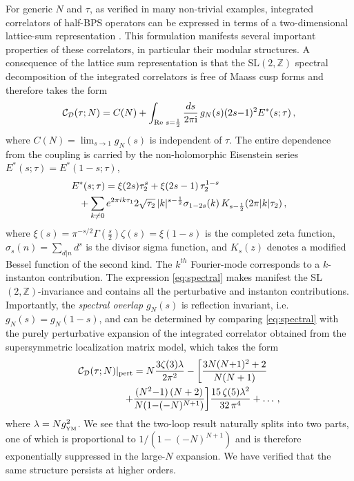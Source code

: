 \documentclass[aps,prl,twocolumn, longbibliography,footinbib,superscriptaddress, preprintnumbers]{revtex4-1}
\newcommand{\<}{\langle}
\renewcommand{\>}{\rangle}
\def\half{{\scriptstyle \frac 12}}
\def\Re{{\rm Re \,}}
\begin{document}
For generic $N$ and $\tau$, as verified in many non-trivial examples, integrated correlators of half-BPS operators can be expressed in terms of a two-dimensional lattice-sum representation \cite{Dorigoni:2021guq, Dorigoni:2021bvj}. This formulation manifests several important properties of these correlators, in particular their modular structures. A consequence of the lattice sum representation is that the SL$(2,\mathbb{Z})$ spectral decomposition of the integrated correlators is free of Maass cusp forms and therefore takes the form \cite{Collier:2022emf,Paul:2022piq}
\begin{align} \label{eq:spectral}
 \mathcal{C}_{\mathcal{D}}(\tau; N)
 = C(N)
 + \int_{\Re\, s=\frac{1}{2}} \frac{ds}{2\pi {\rm i} } \, g_N(s) (2s{-}1)^2  E^*(s;\tau)\, ,
\end{align}
 where ${C}(N) =\lim_{s \to 1} g_N(s)$ is independent of $\tau$. The entire dependence from the coupling is carried by the non-holomorphic Eisenstein series $E^*(s; \tau)=E^*(1{-}s; \tau)$,
 \begin{align}
 &  E^*(s;\tau)
\label{Eisen_series_definitions} =\xi(2s)\tau_2^s  +  \xi(2s-1)\, \tau_2^{1-s}\\
&\notag \phantom{=}+ \sum_{   k\neq0}e^{2\pi i k\tau_1}    2\sqrt{\tau_2}\,  |k|^{s-\half}\sigma_{1-2s} (k)     \, K_{s-\half}(2\pi |k| \tau_2) \,,
\end{align}
where $\xi(s) = \pi^{-s/2}\Gamma(\frac{s}{2})\zeta(s)=\xi(1{-}s)$ is the completed zeta function, $\sigma_s(n) = \sum_{d\vert n }d^s$ is the divisor sigma function, and $K_s(z)$ denotes a modified Bessel function of the second kind.
The $k^{th}$ Fourier-mode corresponds to a $k$-instanton contribution. The expression \eqref{eq:spectral} makes manifest the SL$(2, \mathbb{Z})$-invariance and contains all the perturbative and instanton contributions. Importantly, the \textit{spectral overlap} $g_N(s)$ is reflection invariant, i.e. $g_N(s)=g_N(1{-}s)$, and can be determined by comparing \eqref{eq:spectral} with the purely perturbative expansion of the integrated correlator obtained from the supersymmetric localization matrix model, which takes the form
        \begin{align} \label{eq:pert-2loop}
\mathcal{C}_{\mathcal{D}} (\tau; N)\vert_{\rm pert} &=     N    \frac {3 \zeta (3) \lambda} {2\pi^2}  -  \bigg[ \frac{ 3 N (N {+} 1)^2 + 2 }{N (N+1)}  \\
+ & \frac{(N^2{-}1) \left(N+2\right)}{N (1 {-} (-N)^{N+1})}\bigg] \frac{15 \, \zeta (5) \lambda^2}{ 32 \, \pi^4} + \ldots \, , \nonumber
  \end{align}
where $\lambda=N g^2_{_{\rm YM}}$.
We see that the two-loop result naturally splits into two parts, one of which is proportional to $1/(1 - (-N)^{N+1})$ and is therefore exponentially suppressed in the large-$N$ expansion. We have verified that the same structure persists at higher orders.
\end{document}
